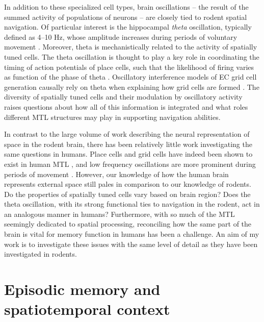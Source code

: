 In addition to these specialized cell types, brain oscillations -- the result of the summed activity of populations of neurons \citep{LachEtal03} -- are closely tied to rodent spatial navigation. Of particular interest is the hippocampal \textit{theta} oscillation, typically defined as 4--10 Hz, whose amplitude increases during periods of voluntary movement \citep{Vand69}. Moreover, theta is mechanistically related to the activity of spatially tuned cells. The theta oscillation is thought to play a key role in coordinating the timing of action potentials of place cells, such that the likelihood of firing varies as function of the phase of theta \citep{OKeeRecc93,SkagEtal96}. Oscillatory interference models of EC grid cell generation causally rely on theta when explaining how grid cells are formed \citep{BurgEtal07}. The diversity of spatially tuned cells and their modulation by oscillatory activity raises questions about how all of this information is integrated and what roles different MTL structures may play in supporting navigation abilities.

In contrast to the large volume of work describing the neural representation of space in the rodent brain, there has been relatively little work investigating the same questions in humans. Place cells and grid cells have indeed been shown to exist in human MTL \citep{EkstEtal03,JacoEtal10,JacoEtal13}, and low frequency oscillations are more prominent during periods of movement \citep{CaplEtal03,KahaEtal99}. However, our knowledge of how the human brain represents external space still pales in comparison to our knowledge of rodents. Do the properties of spatially tuned cells vary based on brain region? Does the theta oscillation, with its strong functional ties to navigation in the rodent, act in an analogous manner in humans? Furthermore, with so much of the MTL seemingly dedicated to spatial processing, reconciling how the same part of the brain is vital for memory function in humans has been a challenge. An aim of my work is to investigate these issues with the same level of detail as they have been investigated in rodents.





\section{Episodic memory and spatiotemporal context}

